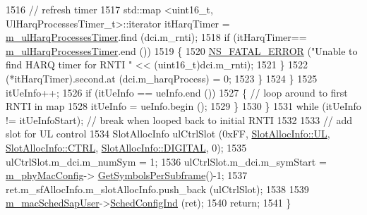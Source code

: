 \begin{DoxyCode}
1516                                 \textcolor{comment}{// refresh timer}
1517                                 std::map <uint16\_t, UlHarqProcessesTimer\_t>::iterator itHarqTimer =  
      \hyperlink{classns3_1_1MmWaveFlexTtiMacScheduler_a27a2652523d0e61fa7da08a7d43b84a1}{m\_ulHarqProcessesTimer}.find (dci.m\_rnti);
1518                                 \textcolor{keywordflow}{if} (itHarqTimer== \hyperlink{classns3_1_1MmWaveFlexTtiMacScheduler_a27a2652523d0e61fa7da08a7d43b84a1}{m\_ulHarqProcessesTimer}.end ())
1519                                 \{
1520                                         \hyperlink{group__fatal_ga5131d5e3f75d7d4cbfd706ac456fdc85}{NS\_FATAL\_ERROR} (\textcolor{stringliteral}{"Unable to find HARQ timer for RNTI "}
       << (uint16\_t)dci.m\_rnti);
1521                                 \}
1522                                 (*itHarqTimer).second.at (dci.m\_harqProcess) = 0;
1523                         \}
1524                 \}
1525                 itUeInfo++;
1526                 \textcolor{keywordflow}{if} (itUeInfo == ueInfo.end ())
1527                 \{ \textcolor{comment}{// loop around to first RNTI in map}
1528                         itUeInfo = ueInfo.begin ();
1529                 \}
1530         \}
1531         \textcolor{keywordflow}{while} (itUeInfo != itUeInfoStart); \textcolor{comment}{// break when looped back to initial RNTI}
1532 
1533         \textcolor{comment}{// add slot for UL control}
1534         SlotAllocInfo ulCtrlSlot (0xFF, \hyperlink{structns3_1_1SlotAllocInfo_a6cad60db1d39034f1851e2cea625fe5da916b5be54594ead6ed677c570311cad2}{SlotAllocInfo::UL}, 
      \hyperlink{structns3_1_1SlotAllocInfo_a3ea7cb503bfd0c9a4df55a71b81b9331ad78b7d76ef82d56c33be1fa9c1867409}{SlotAllocInfo::CTRL}, \hyperlink{structns3_1_1SlotAllocInfo_adcbd067d82be6260b3399167d8f0b4eca47a67c342db658a08ded9ce4b49417ea}{SlotAllocInfo::DIGITAL}, 0);
1535         ulCtrlSlot.m\_dci.m\_numSym = 1;
1536         ulCtrlSlot.m\_dci.m\_symStart = \hyperlink{classns3_1_1MmWaveMacScheduler_a24d7af4971d2e500fe543cefbafa2fd9}{m\_phyMacConfig}->
      \hyperlink{classns3_1_1MmWavePhyMacCommon_a2fe835b76e3c689defa413e395cd10cb}{GetSymbolsPerSubframe}()-1;
1537         ret.m\_sfAllocInfo.m\_slotAllocInfo.push\_back (ulCtrlSlot);
1538 
1539         \hyperlink{classns3_1_1MmWaveFlexTtiMacScheduler_aea2c0392508e0b7f0a582d20c7068e84}{m\_macSchedSapUser}->\hyperlink{classns3_1_1MmWaveMacSchedSapUser_ac164dd52215c3924cf421b56089eece4}{SchedConfigInd} (ret);
1540         \textcolor{keywordflow}{return};
1541 \}
\end{DoxyCode}


